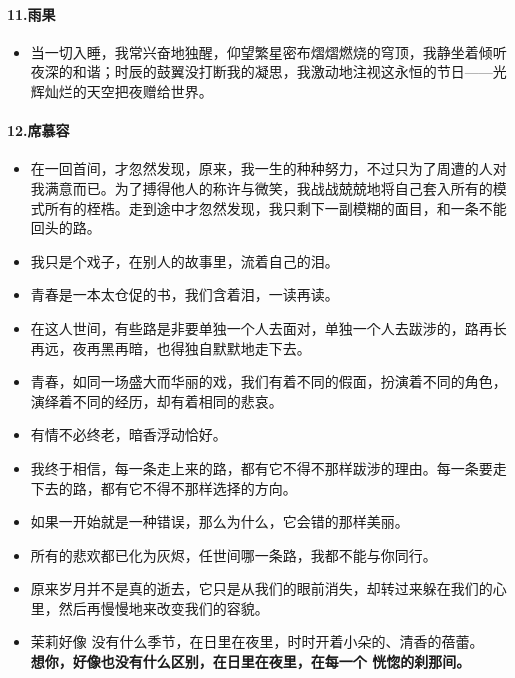 \documentclass[UTF8,a4paper,8pt]{ctexbook}
\begin{document}
	\paragraph{11.雨果}
	\begin{itemize}
		\item 当一切入睡，我常兴奋地独醒，仰望繁星密布熠熠燃烧的穹顶，我静坐着倾听夜深的和谐；时辰的鼓翼没打断我的凝思，我激动地注视这永恒的节日——光辉灿烂的天空把夜赠给世界。
	\end{itemize}
	
	\paragraph{12.席慕容}
		\begin{itemize}
			\item 在一回首间，才忽然发现，原来，我一生的种种努力，不过只为了周遭的人对我满意而已。为了搏得他人的称许与微笑，我战战兢兢地将自己套入所有的模式所有的桎梏。走到途中才忽然发现，我只剩下一副模糊的面目，和一条不能回头的路。
			\item 我只是个戏子，在别人的故事里，流着自己的泪。
			\item 青春是一本太仓促的书，我们含着泪，一读再读。
			\item 在这人世间，有些路是非要单独一个人去面对，单独一个人去跋涉的，路再长再远，夜再黑再暗，也得独自默默地走下去。
			\item 青春，如同一场盛大而华丽的戏，我们有着不同的假面，扮演着不同的角色，演绎着不同的经历，却有着相同的悲哀。
			\item 有情不必终老，暗香浮动恰好。
			\item 我终于相信，每一条走上来的路，都有它不得不那样跋涉的理由。每一条要走下去的路，都有它不得不那样选择的方向。
			\item 如果一开始就是一种错误，那么为什么，它会错的那样美丽。
			\item 所有的悲欢都已化为灰烬，任世间哪一条路，我都不能与你同行。
			\item 原来岁月并不是真的逝去，它只是从我们的眼前消失，却转过来躲在我们的心里，然后再慢慢地来改变我们的容貌。
			\item 茉莉好像
				没有什么季节，在日里在夜里，时时开着小朵的、清香的蓓蕾。\\
				\textbf{想你，好像也没有什么区别，在日里在夜里，在每一个 恍惚的刹那间。}
		\end{itemize}
		
\end{document}
